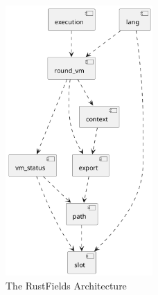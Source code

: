 \begin{figure}[h]
    \centering
    \includegraphics[width=0.5\textwidth]{figures/diagrams/img/rufi-core-architecture.png}
    \caption{The RustFields Architecture}
    \label{fig:rufi-core-architecture}
\end{figure}

